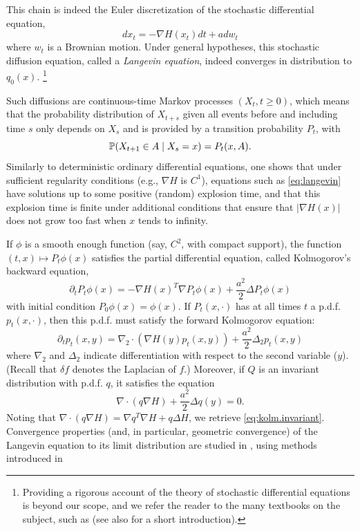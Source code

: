 \begin{remark}

\label{rem:langevin}
This chain is indeed the Euler discretization \citep{kloeden1992numerical} of the stochastic differential equation,
\begin{equation}
\label{eq:langevin}
dx_t = - \nabla H(x_t) dt + a dw_t
\end{equation}
where $w_t$ is a Brownian motion.
Under general hypotheses, this stochastic diffusion equation, called a {\em Langevin equation}, indeed converges in distribution to $q_0(x)$. 
\footnote{Providing a rigorous account of the  theory of stochastic differential equations is beyond our scope, and we refer the reader to the many textbooks on the subject, such as \citet{mckean1969stochastic,ikeda1981stochastic,ethier1986markov} (see also \citet{berglund2021long} for a short introduction).} 

Such diffusions are continuous-time Markov processes $(X_t, t\geq 0)$, which means that the probability distribution of $X_{t+s}$ given all events  before and including time $s$  only depends on $X_s$ and is provided by a transition probability $P_t$, with
\[
\bm{\mathbb P}(X_{t+1} \in A \mid X_s = x) = P_t(x, A).
\]
Similarly to deterministic ordinary differential equations, one shows that under sufficient regularity conditions (e.g., $\nabla H$ is $C^1$), equations such as \cref{eq:langevin} have solutions up to some positive (random) explosion time, and that this explosion time is finite under additional conditions that ensure that $|\nabla H(x)|$ does not grow too fast when $x$ tends to infinity. 

If $\phi$ is a smooth enough function (say, $C^2$, with compact support), the function $(t, x) \mapsto P_t\phi(x)$ satisfies the partial differential equation, called Kolmogorov's backward equation,
\[
\partial_t P_t\phi(x) = - \nabla H(x)^T\nabla P_t\phi(x) + \frac {a^2}2 \Delta P_t\phi(x)
\] 
with initial condition $P_0\phi(x) = \phi(x)$. If $P_t(x, \cdot)$ has at all times $t$ a p.d.f. $p_t(x, \cdot)$, then this p.d.f. must satisfy the forward Kolmogorov equation:
\[
\partial_t p_t(x, y) = \nabla_2 \cdot (\nabla H(y) p_t(x,y)) + \frac {a^2}2 \Delta_2 p_t(x,y)
\] 
where $\nabla_2$ and $\Delta_2$ indicate differentiation with respect to the second variable ($y$). (Recall that $\delta f$ denotes the Laplacian of $f$.)  
Moreover, if $Q$ is an invariant distribution with p.d.f. $q$, it satisfies the equation 
\[
\nabla\cdot (q \nabla H) + \frac {a^2}2 \Delta q(y) = 0.
\]
Noting that $\nabla\cdot (q \nabla H) = \nabla q^T \nabla H + q \Delta H$, we retrieve \cref{eq:kolm.invariant}. Convergence properties (and, in particular, geometric convergence) of the Langevin equation to its limit distribution are studied in \citet{roberts1996exponential}, using methods introduced in \citet{meyn1993stabilityII,meyn1993stabilityIII,meyn2012markov}
\end{remark} 



